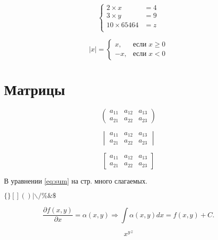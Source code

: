 \documentclass[a4paper,12pt]{article} %
\begin{document}
\[
	\left\{
		\begin{aligned}
			2\times x &= 4  \\
			3\times y &= 9\\
			10 \times 65464 &= z\\
		\end{aligned}
	\right.
\]

\[
	|x|=\begin{cases}
		x, &\text{если }  x \ge 0 \\
		-x, &\text{если } x<0
	\end{cases}
\]

\section{Матрицы}

\[
	\begin{pmatrix}
		a_{11} & a_{12} & a_{13} \\
		a_{21} & a_{22} & a_{23}
	\end{pmatrix}
\]

\[
	\begin{vmatrix}
		a_{11} & a_{12} & a_{13} \\
		a_{21} & a_{22} & a_{23}
	\end{vmatrix}
\]

\[
	\begin{bmatrix}
		a_{11} & a_{12} & a_{13} \\
		a_{21} & a_{22} & a_{23}
	\end{bmatrix}
\]

В уравнении \eqref{eq:sum} на стр. \pageref{eq:sum} много слагаемых.

$ \{ \} [] () | \backslash / \% \& \$ $

\[\frac{\partial f (x ,y)}{\partial x} = \alpha (x,y)
\Rightarrow \int \alpha( x,y) dx = f(x, y) + C.\]

\[{x^y}^z\]
\end{document}
